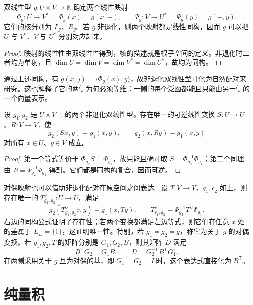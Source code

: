 \begin{theorem}
\label{thm:bilinear-nondegenerate-duality}
双线性型 $g:U\times V\to\mathbb K$ 确定两个线性映射
\[
    \Phi_g:U\to V^*,\quad \Phi_g(x)=g(x,-),
    \qquad
    \Psi_g:V\to U^*,\quad \Psi_g(y)=g(-,y).
\]
它们的核分别为 $L_g$、$R_g$。若 $g$ 非退化，则两个映射都是线性同构，因而 $g$ 可以把 $U$ 与 $V^*$、$V$ 与 $U^*$ 分别对应起来。
\end{theorem}

\begin{proof}
映射的线性性由双线性性得到，核的描述就是根子空间的定义。非退化时二者均为单射，且 $\dim U=\dim V=\dim V^*=\dim U^*$，故均为同构。
\end{proof}

通过上述同构，有 $g(x,y)=\langle\Phi_g(x),y\rangle$，故非退化双线性型可化为自然配对来研究。这也解释了它的两侧为何必须等维：一侧的每个泛函都能且只能由另一侧的一个向量表示。

\begin{proposition}
\label{prop:bilinear-compare-pairings}
设 $g_1,g_2$ 是 $U\times V$ 上的两个非退化双线性型。存在唯一的可逆线性变换 $S:U\to U$、$R:V\to V$，使
\[
    g_2(Sx,y)=g_1(x,y),\qquad
    g_2(x,Ry)=g_1(x,y)
\]
对所有 $x\in U$、$y\in V$ 成立。
\end{proposition}

\begin{proof}
第一个等式等价于 $\Phi_{g_2}S=\Phi_{g_1}$，故只能且确可取 $S=\Phi_{g_2}^{-1}\Phi_{g_1}$；第二个同理由 $R=\Psi_{g_2}^{-1}\Psi_{g_1}$ 得到。它们都是同构的复合，因而可逆。
\end{proof}

对偶映射也可以借助非退化配对在原空间之间表达。设 $T:V\to V$，$g_1,g_2$ 如上，则存在唯一的 $T^\vee_{g_1,g_2}:U\to U$，满足
\begin{equation}
\label{eq:bilinear-relative-dual}
    g_2(T^\vee_{g_1,g_2}x,y)=g_1(x,Ty),
    \qquad T^\vee_{g_1,g_2}=\Phi_{g_2}^{-1}T^\vee\Phi_{g_1}.
\end{equation}
右边的同构公式证明了存在性；若两个变换都满足左边等式，则它们在任意 $x$ 处的差属于 $L_{g_2}=\{0\}$，这证明唯一性。特别，若 $g_1=g_2=g$，称它为关于 $g$ 的对偶变换。若 $g_1,g_2,T$ 的矩阵分别是 $G_1,G_2,B$，则其矩阵 $D$ 满足
\[
    D^{\mathsf T}G_2=G_1B,\qquad
    D=G_2^{-\mathsf T}B^{\mathsf T}G_1^{\mathsf T}.
\]
在两侧采用关于 $g$ 互为对偶的基，即 $G_1=G_2=I$ 时，这个表达式直接化为 $B^{\mathsf T}$。

\section{纯量积}
\label{sec:bilinear-scalar-products}

